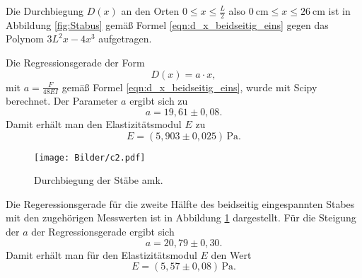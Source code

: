 Die Durchbiegung $D(x)$ an den Orten $0 \leq x \leq \frac{L}{2}$
also $\SI{0}{\centi\meter} \leq x \leq \SI{26}{\centi\meter}$ 
ist in Abbildung \ref{fig:Stabus} gemäß Formel \eqref{eqn:d_x_beidseitig_eins} gegen das 
Polynom $3L^2x - 4x^3$ aufgetragen.

Die Regressionsgerade der Form
\begin{equation*}
	D(x) = a \cdot x \mathrm{,}
\end{equation*}
mit $a = \frac{F}{48EI}$ gemäß Formel \eqref{eqn:d_x_beidseitig_eins}, wurde mit Scipy 
\cite{scipy} berechnet.
Der Parameter $a$ ergibt sich zu
\begin{equation*}
	a = 19,61 \pm 0,08 \mathrm{.}
\end{equation*}
Damit erhält man den Elastizitätsmodul $E$ zu
\begin{equation*}
	E = (5,903 \pm 0,025) \, \si{\pascal} \mathrm{.}
\end{equation*}
\begin{figure}
	\centering
	\texttt{[image: Bilder/c2.pdf]}
	\caption{Durchbiegung der Stäbe amk.}
	\label{fig:StabusMaximus}
\end{figure}

Die Regeressionsgerade für die zweite Hälfte des beidseitig eingespannten Stabes  mit den
zugehörigen Messwerten ist in Abbildung \ref{fig:StabusMaximus} dargestellt.
Für die Steigung der $a$ der Regressionsgerade ergibt sich
\begin{equation*}
	a = 20,79 \pm 0,30  \mathrm{.}
\end{equation*}
Damit erhält man für den Elastizitätsmodul $E$ den Wert 
\begin{equation*}
	E = (5,57 \pm 0,08) \, \si{\pascal} \mathrm{.}
\end{equation*}

